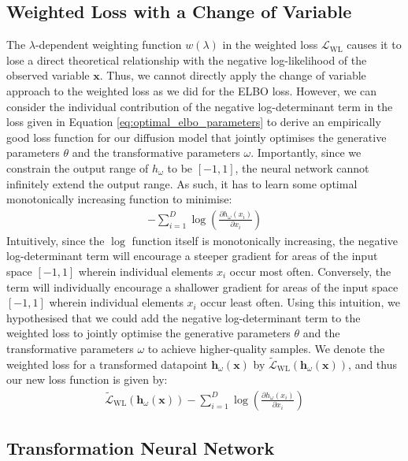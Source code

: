\documentclass[ oneside,%
                    author={George Herbert},
                    degree={MSci},
                     title={Diffusion Models for Time-Evolving Precipitation Fields},
                  subtitle={}]{dissertation}
\begin{document}
\subsection{Weighted Loss with a Change of Variable}

The $\lambda$-dependent weighting function $w(\lambda)$ in the weighted loss $\mathcal{L}_{\mathrm{WL}}$ causes it to lose a direct theoretical relationship with the negative log-likelihood of the observed variable $\mathbf{x}$. Thus, we cannot directly apply the change of variable approach to the weighted loss as we did for the ELBO loss. However, we can consider the individual contribution of the negative log-determinant term in the loss given in Equation \ref{eq:optimal_elbo_parameters} to derive an empirically good loss function for our diffusion model that jointly optimises the generative parameters $\theta$ and the transformative parameters $\omega$. Importantly, since we constrain the output range of $h_\omega$ to be $[-1,1]$, the neural network cannot infinitely extend the output range. As such, it has to learn some optimal monotonically increasing function to minimise:
\begin{align}
      -\sum_{i=1}^D \log \left(\frac{\partial h_\omega(x_i)}{\partial x_i}\right)
\end{align}
Intuitively, since the $\log$ function itself is monotonically increasing, the negative log-determinant term will encourage a steeper gradient for areas of the input space $[-1, 1]$ wherein individual elements $x_i$ occur most often. Conversely, the term will individually encourage a shallower gradient for areas of the input space $[-1, 1]$ wherein individual elements $x_i$ occur least often. Using this intuition, we hypothesised that we could add the negative log-determinant term to the weighted loss to jointly optimise the generative parameters $\theta$ and the transformative parameters $\omega$ to achieve higher-quality samples. We denote the weighted loss for a transformed datapoint $\mathbf{h}_\omega(\mathbf{x})$ by $\tilde{\mathcal{L}}_{\mathrm{WL}}(\mathbf{h}_\omega(\mathbf{x}))$, and thus our new loss function is given by:
\begin{align}
      \tilde{\mathcal{L}}_{\mathrm{WL}}(\mathbf{h}_\omega(\mathbf{x})) - \sum_{i=1}^D \log \left(\frac{\partial h_\omega(x_i)}{\partial x_i}\right)\label{eq:weighted_loss_transform}
\end{align}

\subsection{Transformation Neural Network}
\end{document}
